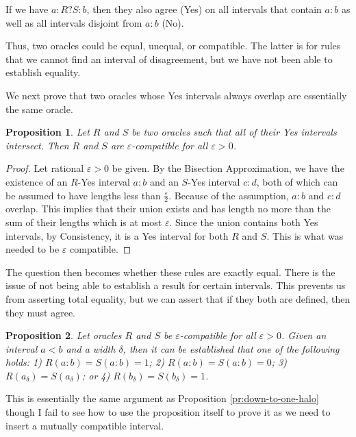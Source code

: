 \documentclass[12pt]{article}
\newtheorem{proposition}{Proposition}[subsection]
\begin{document}
If we have $a:R?S:b$, then they also agree (Yes) on all intervals that contain $a:b$ as well as all intervals disjoint from $a:b$ (No). 

Thus, two oracles could be equal, unequal, or compatible. The latter is for rules that we cannot find an interval of disagreement, but we have not been able to establish equality. 

We next prove that two oracles whose Yes intervals always overlap are essentially the same oracle.

\begin{proposition}\label{pr:overlap}
Let $R$ and $S$ be two oracles such that all of their Yes intervals intersect. Then $R$ and $S$ are $\varepsilon$-compatible for all $\varepsilon > 0$.
\end{proposition}


\begin{proof}
Let rational $\varepsilon > 0$ be given. By the Bisection Approximation, we have the existence of an $R$-Yes interval $a:b$ and an $S$-Yes interval $c:d$, both of which can be assumed to have lengths less than $\frac{\varepsilon}{2}$. Because of the assumption, $a:b$ and $c:d$ overlap. This implies that their union exists and has length no more than the sum of their lengths which is at most $\varepsilon$. Since the union contains both Yes intervals, by Consistency, it is a Yes interval for both $R$ and $S$. This is what was needed to be $\varepsilon$ compatible. 
\end{proof}

The question then becomes whether these rules are exactly equal. There is the issue of not being able to establish a result for certain intervals. This prevents us from asserting total equality, but we can assert that if they both are defined, then they must agree. 

\begin{proposition}
    Let oracles $R$ and $S$ be $\varepsilon$-compatible for all $\varepsilon >0$. Given an interval $a\lt b$ and a width $\delta$, then it can be established that one of the following holds: 1) $R(a:b) = S(a:b) = 1$; 2) $R(a:b)=S(a:b)=0$;  3) $R(a_\delta) = S(a_\delta)$; or 4) $R(b_\delta)=S(b_\delta)= 1$.
\end{proposition}

This is essentially the same argument as Proposition \ref{pr:down-to-one-halo} though I fail to see how to use the proposition itself to prove it as we need to insert a mutually compatible interval. 
\end{document}
